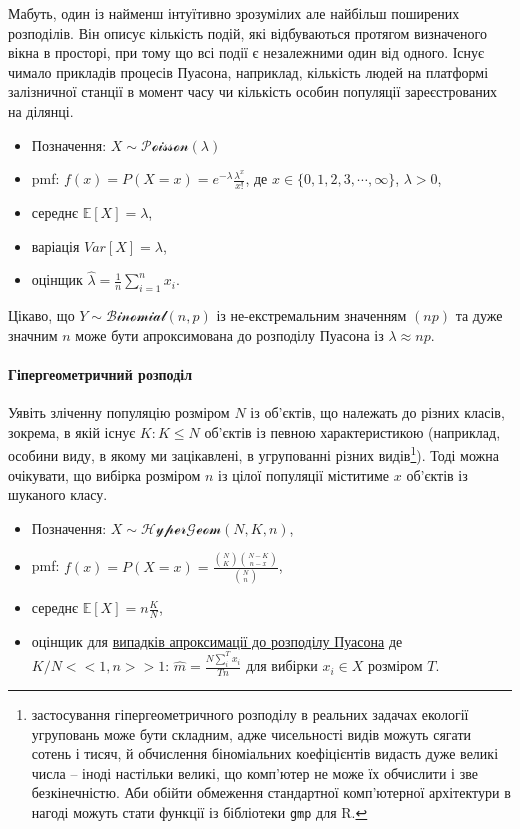 \documentclass[
  11pt,
]{book}
\begin{document}
Мабуть, один із найменш інтуїтивно зрозумілих але найбільш поширених розподілів. Він описує кількість подій, які відбуваються протягом визначеного вікна в просторі, при тому що всі події є незалежними один від одного. Існує чимало прикладів процесів Пуасона, наприклад, кількість людей на платформі залізничної станції в момент часу чи кількість особин популяції зареєстрованих на ділянці.

\begin{itemize}
\item
  Позначення: \(X \sim \mathcal{Poisson}(\lambda)\)
\item
  pmf: \(f(x) = P(X = x) = e^{-\lambda} \frac{\lambda^x}{x!}\), де \(x \in \{0, 1, 2, 3, \cdots, \infty \}\), \(\lambda > 0\),
\item
  середнє \(\mathbb{E} [X] = \lambda\),
\item
  варіація \(Var[X] = \lambda\),
\item
  оцінщик \(\hat{\lambda} = \frac{1}{n} \sum \limits_{i=1}^{n}x_i\).
\end{itemize}

Цікаво, що \(Y \sim \mathcal{Binomial}(n, p)\) із не-екстремальним значенням \((np)\) та дуже значним \(n\) може бути апроксимована до розподілу Пуасона із \(\lambda \approx np\).

\paragraph{Гіпергеометричний розподіл}\label{ux433ux456ux43fux435ux440ux433ux435ux43eux43cux435ux442ux440ux438ux447ux43dux438ux439-ux440ux43eux437ux43fux43eux434ux456ux43b}

Уявіть зліченну популяцію розміром \(N\) із об'єктів, що належать до різних класів, зокрема, в якій існує \(K: K \leq N\) об'єктів із певною характеристикою (наприклад, особини виду, в якому ми зацікавлені, в угрупованні різних видів\footnote{застосування гіпергеометричного розподілу в реальних задачах екології угруповань може бути складним, адже чисельності видів можуть сягати сотень і тисяч, й обчислення біноміальних коефіцієнтів видасть дуже великі числа -- іноді настільки великі, що комп'ютер не може їх обчислити і зве безкінечністю. Аби обійти обмеження стандартної комп'ютерної архітектури в нагоді можуть стати функції із бібліотеки \texttt{gmp} для R.}). Тоді можна очікувати, що вибірка розміром \(n\) із цілої популяції міститиме \(x\) об'єктів із шуканого класу.

\begin{itemize}
\item
  Позначення: \(X \sim \mathcal{HyperGeom}(N, K, n)\),
\item
  pmf: \(f(x) = P(X = x) = \frac{\binom{N}{K} \binom{N-K}{n - x}}{\binom{N}{n}}\),
\item
  середнє \(\mathbb{E} [X] = n \frac{K}{N}\),
\item
  оцінщик для \href{https://math.stackexchange.com/questions/40319/maximum-likelihood-estimate-of-hypergeometric-distribution-parameter}{випадків апроксимації до розподілу Пуасона} де \(K/N << 1, n >> 1\): \(\hat{m} = \frac{N \sum \limits_i^T x_i}{Tn}\) для вибірки \(x_i \in X\) розміром \(T\).
\end{itemize}
\end{document}

